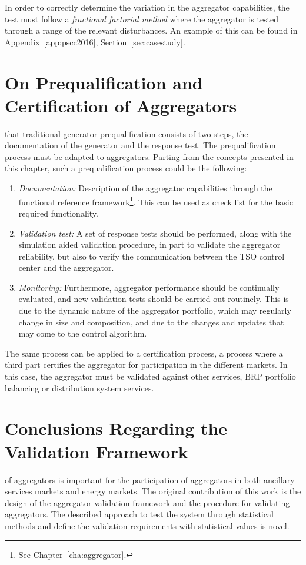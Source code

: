 In order to correctly determine the variation in the aggregator capabilities, the test must follow a \emph{fractional factorial method} where the aggregator is tested through a range of the relevant disturbances. An example of this can be found in Appendix~\ref{app:pscc2016}, Section~\ref{sec:casestudy}.

\section{On Prequalification and Certification of Aggregators}\label{sec:aggpreq}
 that traditional generator prequalification consists of two steps, the documentation of the generator and the response test. The prequalification process must be adapted to aggregators. Parting from the concepts presented in this chapter, such a prequalification process could be the following:
\begin{enumerate}
	\item \emph{Documentation:} Description of the aggregator capabilities through the functional reference framework\footnote{See Chapter~\ref{cha:aggregator}.}. This can be used as check list for the basic required functionality.
	\item \emph{Validation test:} A set of response tests should be performed, along with the simulation aided validation procedure, in part to validate the aggregator reliability, but also to verify the communication between the TSO control center and the aggregator.
	\item \emph{Monitoring:} Furthermore, aggregator performance should be continually evaluated, and new validation tests should be carried out routinely. This is due to the dynamic nature of the aggregator portfolio, which may regularly change in size and composition, and due to the changes and updates that may come to the control algorithm.
\end{enumerate}

The same process can be applied to a certification process, \ie a process where a third part certifies the aggregator for participation in the different markets. In this case, the aggregator must be validated against other services, \eg BRP portfolio balancing or distribution system services.

\section{Conclusions Regarding the Validation Framework}
 of aggregators is important for the participation of aggregators in both ancillary services markets and energy markets. The original contribution of this work is the design of the aggregator validation framework and the procedure for validating aggregators. The described approach to test the system through statistical methods and define the validation requirements with statistical values is novel.

